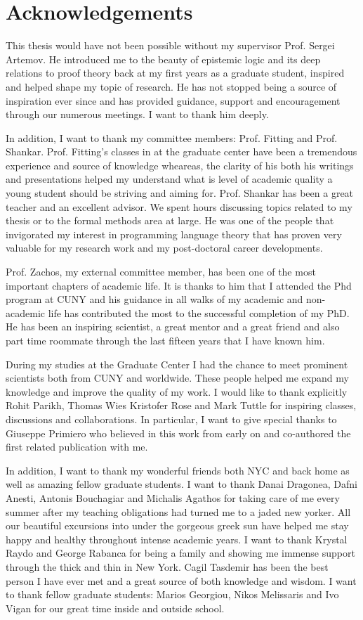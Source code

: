 \section*{Acknowledgements}
This thesis would have not been possible without my supervisor Prof. Sergei Artemov.
He introduced me to the beauty of epistemic logic and its deep relations to proof theory
back at my first years as a graduate student, inspired and helped shape my topic of research. 
He has not stopped being a source of inspiration ever
since and has provided guidance, support and encouragement through our numerous meetings. 
I want to thank him deeply.

In addition, I want to thank my committee members: Prof. Fitting and Prof. Shankar. Prof. Fitting's classes
in at the graduate center have been a tremendous experience and source of knowledge wheareas,
the clarity of his both his writings and presentations helped my understand what is 
level of academic quality a young student should be striving and aiming for. Prof. Shankar has
been a great teacher and an excellent advisor. We spent hours 
discussing topics related to my thesis or to the formal methods area at large. He was one
of the people that invigorated my interest in programming language theory that has
proven very valuable for my research work and my post-doctoral career developments.

Prof. Zachos, my external committee member, has been one of the most important
chapters of academic life. It is thanks to him that I attended the Phd program at CUNY
and his guidance in all walks of my academic and non-academic life has contributed 
the most  to the successful completion of my PhD. He has been an inspiring
scientist, a great mentor and a great friend and also part time roommate through the last fifteen years that I have 
known him. 

During my studies at the Graduate Center I had the chance to meet 
prominent scientists both from CUNY and worldwide. 
These people helped me expand my knowledge and improve
the quality of my work. I would like to thank explicitly Rohit Parikh, Thomas Wies 
Kristofer Rose  and Mark Tuttle for inspiring classes, discussions and collaborations.
In particular, I want to give special thanks to Giuseppe Primiero who believed in this work
from early on and co-authored the first related publication with me.

In addition, I want to thank my wonderful friends both NYC and back home as well as 
amazing fellow graduate students. I want to thank Danai Dragonea, Dafni Anesti, Antonis Bouchagiar 
and Michalis Agathos for taking care of me every summer after my teaching obligations
had turned me to a jaded new yorker. All our beautiful excursions into under the gorgeous
greek sun have helped me stay happy and healthy throughout intense academic years.
I want to thank Krystal Raydo and George Rabanca for being a family and showing me immense support
through the thick and thin in New York. Cagil Tasdemir has been the best person I have ever met and a great source of both knowledge and wisdom.
I want to thank fellow graduate students: Marios Georgiou,
Nikos Melissaris and Ivo Vigan for our great time inside and outside school.

